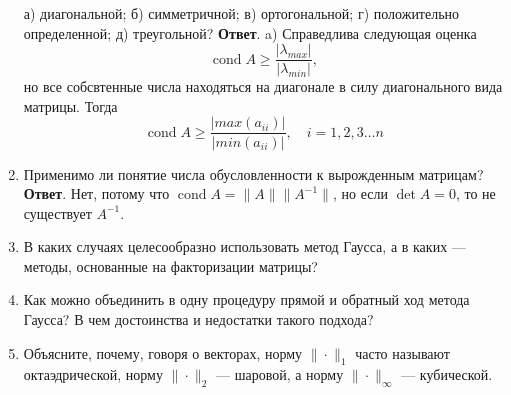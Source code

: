 \documentclass{article}
\newcommand{\cond}{\mathop{\mathrm{cond}}\nolimits}
\begin{document}
\begin{enumerate}
    а) диагональной;
    б) симметричной;
    в) ортогональной;
    г) положительно определенной;
    д) треугольной?
    \newline
    {\bfseries Ответ}.
    a) Справедлива следующая оценка
    \begin{equation*}
        \cond A \geqslant \frac{| \lambda_{max}|}{|\lambda_{min}|},
    \end{equation*}
    но все собсвтенные числа находяться на диагонале в силу диагонального вида матрицы.
    Тогда
    \begin{equation*}
        \cond A \geqslant \frac{|max(a_{ii})|}{|min(a_{ii})|}, \quad i = 1,2,3 \ldots n
    \end{equation*}
    \item Применимо ли понятие числа обусловленности к вырожденным матрицам?
    \newline
    {\bfseries Ответ}. Нет, потому что $\cond A = \|A\| \|A^{-1}\|$, но если
    $\det A = 0$, то не существует $A^{-1}$.

    \item В каких случаях целесообразно использовать метод Гаусса,
    а в каких — методы, основанные на факторизации матрицы?

    \item Как можно объединить в одну процедуру прямой и обратный ход метода Гаусса? В чем достоинства и недостатки
    такого подхода?

    \item Объясните, почему, говоря о векторах, норму $\|\cdot\|_1$ часто
    называют октаэдрической, норму $\|\cdot\|_2$ — шаровой, а норму
    $\|\cdot\|_\infty$ — кубической.
\end{enumerate}
\end{document}
